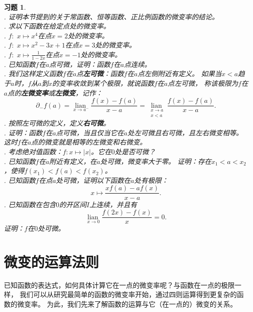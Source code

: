 \documentclass[12pt,UTF8]{ctexbook}
\newcommand{\lian}[1]{
    \underset{#1}{\operatorname{lian}\,}
}
\newtheorem{xt}{习题}[section]
\begin{document}
\begin{xt}
    \mbox{} \\
    . 证明本节提到的关于常函数、恒等函数、正比例函数的微变率的结论。\\
    . 求以下函数在给定点处的微变率。\\
    . $f: \,\, x \mapsto x^4$在点$x = 2$处的微变率。\\
    . $f: \,\, x \mapsto x^2 - 3x + 1$在点$x = 3$处的微变率。\\
    . $f: \,\, x \mapsto \frac{1}{1 - 2x}$在点$x = -1$处的微变率。\\
    . 已知函数$f$在$a$点可微，证明：函数$f$在$a$点连续。\\
    . 我们这样定义函数$f$在$a$点\textbf{左可微}：函数$f$在$a$点左侧附近有定义。
    如果当$x<a$趋于$a$时，$f$从$a$到$x$的变率收敛到某个极限，就说函数$f$在$a$点左可微，
    称该极限为$f$在$a$点的\textbf{左微变率}或\textbf{左微变}，记作：
    $$ \partial_- f(a) = \lian{x\to a^-} \frac{f(x) - f(a)}{x - a} = \lian{\substack{x\to a \\ x < a}} \frac{f(x) - f(a)}{x - a}. $$
    . 按照左可微的定义，定义\textbf{右可微}。\\
    . 证明：函数$f$在$a$点可微，当且仅当它在$a$处左可微且右可微，且左右微变相等。
    这时$f$在$a$点的微变就是相等的左微变和右微变。\\
    . 考虑绝对值函数：$f:x\mapsto |x|$。它在$0$处是否可微？\\
    . 已知函数$f$在$a$附近有定义，在$a$处可微，微变率大于零。
    证明：存在$x_1 < a < x_2$，使得$f(x_1) < f(a) < f(x_2)$。\\
    . 已知函数$f$在点$a$处可微，证明以下函数在$a$处有极限：
    $$ x \mapsto \frac{xf(a) - af(x)}{x - a}.$$
    . 已知函数在包含$0$的开区间$I$上连续，并且有
    $$ \lian{x\to 0} \frac{f(2x) - f(x)}{x} = 0.$$
    \indent 证明：$f$在$0$处可微。
\end{xt}

\section{微变的运算法则}
已知函数的表达式，如何具体计算它在一点的微变率呢？与函数在一点的极限一样，
我们可以从研究最简单的函数的微变率开始，通过四则运算得到更复杂的函数的微变率。
为此，我们先来了解函数的运算与它（在一点的）微变的关系。
\end{document}
